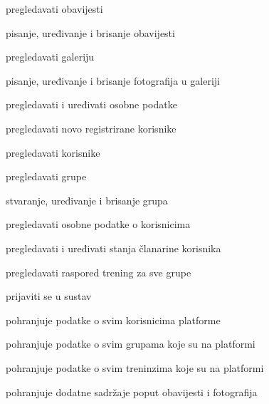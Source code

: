 \documentclass[times, utf8, zavrsni]{fer}
\newenvironment{packed_enum}{
	\begin{enumerate}
		\setlength{\itemsep}{0pt}
		\setlength{\parskip}{0pt}
		\setlength{\parsep}{0pt}
	}{\end{enumerate}}
\begin{document}
\begin{packed_enum}
				\begin{packed_enum}
					
					\item pregledavati obavijesti
					\item pisanje, uređivanje i brisanje obavijesti
					\item pregledavati galeriju
				    \item pisanje, uređivanje i brisanje fotografija u galeriji
					\item pregledavati i uređivati osobne podatke
					\item pregledavati novo registrirane korisnike
					\item pregledavati korisnike
					\item pregledavati grupe
					\item stvaranje, uređivanje i brisanje grupa
					\item pregledavati osobne podatke o korisnicima
					\item pregledavati i uređivati stanja članarine korisnika
					\item pregledavati raspored trening za sve grupe
					\item prijaviti se u sustav
					
				\end{packed_enum}
			
				\item  {}
				
				\begin{packed_enum}
					
					\item pohranjuje podatke o svim korisnicima platforme
					\item pohranjuje podatke o svim grupama koje su na platformi
					\item pohranjuje podatke o svim treninzima koje su na platformi
					\item pohranjuje dodatne sadržaje poput obavijesti i fotografija
					
				\end{packed_enum}
				
			\end{packed_enum}
			
			\eject 
			
				
\end{document}
